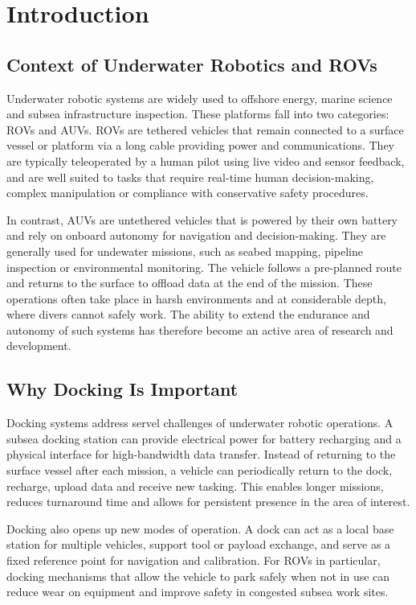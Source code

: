 \section{Introduction}

\subsection{Context of Underwater Robotics and ROVs}

Underwater robotic systems are widely used to offshore energy, marine science and subsea infrastructure inspection. These platforms fall into two categories: ROVs and AUVs. ROVs are tethered vehicles that remain connected to a surface vessel or platform via a long cable providing power and communications. They are typically teleoperated by a human pilot using live video and sensor feedback, and are well suited to tasks that require real-time human decision-making, complex manipulation or compliance with conservative safety procedures.

In contrast, AUVs are untethered vehicles that is powered by their own battery and rely on onboard autonomy for navigation and decision-making. They are generally used for undewater missions, such as seabed mapping, pipeline inspection or environmental monitoring. The vehicle follows a pre-planned route and returns to the surface to offload data at the end of the mission. These operations often take place in harsh environments and at considerable depth, where divers cannot safely work. The ability to extend the endurance and autonomy of such systems has therefore become an active area of research and development.

\subsection{Why Docking Is Important}

Docking systems address servel challenges of underwater robotic operations. A subsea docking station can provide electrical power for battery recharging and a physical interface for high-bandwidth data transfer. Instead of returning to the surface vessel after each mission, a vehicle can periodically return to the dock, recharge, upload data and receive new tasking. This enables longer missions, reduces turnaround time and allows for persistent presence in the area of interest.

Docking also opens up new modes of operation. A dock can act as a local base station for multiple vehicles, support tool or payload exchange, and serve as a fixed reference point for navigation and calibration. For ROVs in particular, docking mechanisms that allow the vehicle to park safely when not in use can reduce wear on equipment and improve safety in congested subsea work sites.

